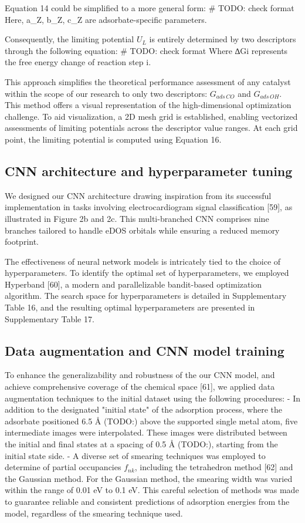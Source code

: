 Equation 14 could be simplified to a more general form:
# TODO: check format
Here, a_Z, b_Z, c_Z are adsorbate-specific parameters.

Consequently, the limiting potential $\textit{U}_{L}$ is entirely determined by two descriptors through the following equation:
# TODO: check format
Where ∆Gi represents the free energy change of reaction step i.

This approach simplifies the theoretical performance assessment of any catalyst within the scope of our research to only two descriptors: $G_{\textit{ads} \, \textit{CO}}$ and $G_{\textit{ads} \, \textit{OH}}$.
This method offers a visual representation of the high-dimensional optimization challenge.
To aid visualization, a 2D mesh grid is established, enabling vectorized assessments of limiting potentials across the descriptor value ranges.
At each grid point, the limiting potential is computed using Equation 16.


\subsection{CNN architecture and hyperparameter tuning}
We designed our CNN architecture drawing inspiration from its successful implementation in tasks involving electrocardiogram signal classification [59], as illustrated in Figure 2b and 2c.
This multi-branched CNN comprises nine branches tailored to handle eDOS orbitals while ensuring a reduced memory footprint.

The effectiveness of neural network models is intricately tied to the choice of hyperparameters.
To identify the optimal set of hyperparameters, we employed Hyperband [60], a modern and parallelizable bandit-based optimization algorithm.
The search space for hyperparameters is detailed in Supplementary Table 16, and the resulting optimal hyperparameters are presented in Supplementary Table 17.


\subsection{Data augmentation and CNN model training}
To enhance the generalizability and robustness of the our CNN model, and achieve comprehensive coverage of the chemical space [61], we applied data augmentation techniques to the initial dataset using the following procedures:
	- In addition to the designated "initial state" of the adsorption process, where the adsorbate positioned 6.5 Å (TODO:) above the supported single metal atom, five intermediate images were interpolated. These images were distributed between the initial and final states at a spacing of 0.5 Å (TODO:), starting from the initial state side.
	- A diverse set of smearing techniques was employed to determine of partial occupancies $f_{nk}$, including the tetrahedron method [62] and the Gaussian method. For the Gaussian method, the smearing width was varied within the range of 0.01 eV to 0.1 eV. This careful selection of methods was made to guarantee reliable and consistent predictions of adsorption energies from the model, regardless of the smearing technique used.


